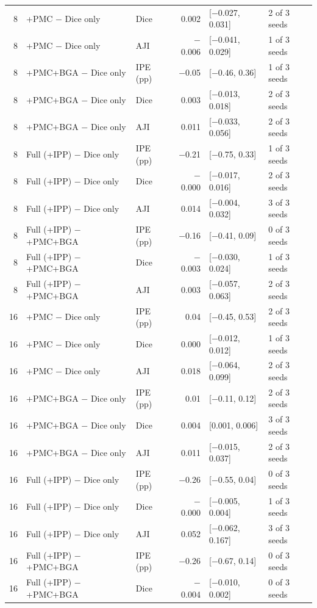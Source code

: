 \documentclass[10pt]{article}
\begin{document}
\begin{landscape}
{\begin{longtable}{r l l r l l}
8 & +PMC $-$ Dice only & Dice & 0.002 & [$-$0.027, 0.031] & 2 of 3 seeds \\
8 & +PMC $-$ Dice only & AJI & $-$0.006 & [$-$0.041, 0.029] & 1 of 3 seeds \\
8 & +PMC+BGA $-$ Dice only & IPE (pp) & $-$0.05 & [$-$0.46, 0.36] & 1 of 3 seeds \\
8 & +PMC+BGA $-$ Dice only & Dice & 0.003 & [$-$0.013, 0.018] & 2 of 3 seeds \\
8 & +PMC+BGA $-$ Dice only & AJI & 0.011 & [$-$0.033, 0.056] & 2 of 3 seeds \\
8 & Full (+IPP) $-$ Dice only & IPE (pp) & $-$0.21 & [$-$0.75, 0.33] & 1 of 3 seeds \\
8 & Full (+IPP) $-$ Dice only & Dice & $-$0.000 & [$-$0.017, 0.016] & 2 of 3 seeds \\
8 & Full (+IPP) $-$ Dice only & AJI & 0.014 & [$-$0.004, 0.032] & 3 of 3 seeds \\
8 & Full (+IPP) $-$ +PMC+BGA & IPE (pp) & $-$0.16 & [$-$0.41, 0.09] & 0 of 3 seeds \\
8 & Full (+IPP) $-$ +PMC+BGA & Dice & $-$0.003 & [$-$0.030, 0.024] & 1 of 3 seeds \\
8 & Full (+IPP) $-$ +PMC+BGA & AJI & 0.003 & [$-$0.057, 0.063] & 2 of 3 seeds \\
16 & +PMC $-$ Dice only & IPE (pp) & 0.04 & [$-$0.45, 0.53] & 2 of 3 seeds \\
16 & +PMC $-$ Dice only & Dice & 0.000 & [$-$0.012, 0.012] & 1 of 3 seeds \\
16 & +PMC $-$ Dice only & AJI & 0.018 & [$-$0.064, 0.099] & 2 of 3 seeds \\
16 & +PMC+BGA $-$ Dice only & IPE (pp) & 0.01 & [$-$0.11, 0.12] & 2 of 3 seeds \\
16 & +PMC+BGA $-$ Dice only & Dice & 0.004 & [0.001, 0.006] & 3 of 3 seeds \\
16 & +PMC+BGA $-$ Dice only & AJI & 0.011 & [$-$0.015, 0.037] & 2 of 3 seeds \\
16 & Full (+IPP) $-$ Dice only & IPE (pp) & $-$0.26 & [$-$0.55, 0.04] & 0 of 3 seeds \\
16 & Full (+IPP) $-$ Dice only & Dice & $-$0.000 & [$-$0.005, 0.004] & 1 of 3 seeds \\
16 & Full (+IPP) $-$ Dice only & AJI & 0.052 & [$-$0.062, 0.167] & 3 of 3 seeds \\
16 & Full (+IPP) $-$ +PMC+BGA & IPE (pp) & $-$0.26 & [$-$0.67, 0.14] & 0 of 3 seeds \\
16 & Full (+IPP) $-$ +PMC+BGA & Dice & $-$0.004 & [$-$0.010, 0.002] & 0 of 3 seeds \\

\end{longtable}}
\end{landscape}
\end{document}
